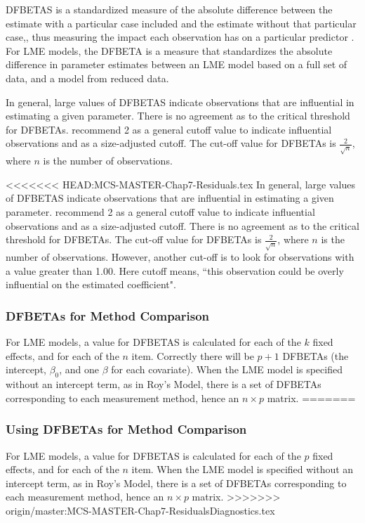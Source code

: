 \documentclass[12pt, a4paper]{report}
\theoremstyle{plain}
\theoremstyle{definition}
\theoremstyle{remark}
\begin{document}
DFBETAS is a standardized measure of the absolute difference between the estimate with a particular
case included and the estimate without that particular case,, thus measuring the impact each observation has on a particular predictor \citep{belsley2005}. For LME models, the DFBETA is a measure that standardizes the absolute difference in parameter estimates between an LME model based on a full set of data, and a model from reduced data.

In general, large values of DFBETAS indicate observations that are influential in estimating a given parameter. There is no agreement as to the critical threshold for DFBETAs. \citet{belsleywelsch} recommend 2 as a general cutoff value to indicate influential observations and as a size-adjusted cutoff.  The cut-off value for DFBETAs is $\frac{2}{\sqrt{n}}$, where $n$ is the number of observations. 



<<<<<<< HEAD:MCS-MASTER-Chap7-Residuals.tex
In general, large values of DFBETAS indicate observations that are influential in estimating a given parameter. \citet{belsley2005} recommend 2 as a general cutoff value to indicate influential observations and as a size-adjusted cutoff. There is no agreement as to the critical threshold for DFBETAs. The cut-off value for DFBETAs is $\frac{2}{\sqrt{n}}$, where $n$ is the number of observations. However, another cut-off is to look for observations with a value greater than 1.00. Here cutoff means,
``this observation could be overly influential on the estimated coefficient".



\subsubsection{DFBETAs for Method Comparison}
	
	For LME models, a value for DFBETAS is calculated for each of the $k$ fixed effects, and for each of the $n$ item. Correctly there will be $p+1$ DFBETAs (the intercept, $\beta_0$, and one $\beta$ for each covariate). When the LME model is specified without an intercept term, as in Roy's Model, there is a set of DFBETAs corresponding to each measurement method, hence an $n \times p$ matrix.
=======
\subsubsection{Using DFBETAs for Method Comparison}
For LME models, a value for DFBETAS is calculated for each of the $p$ fixed effects, and for each of the $n$ item. When the LME model is specified without an intercept term, as in Roy's Model, there is a set of DFBETAs corresponding to each measurement method, hence an $n \times p$ matrix.
>>>>>>> origin/master:MCS-MASTER-Chap7-ResidualsDiagnostics.tex
	
\end{document}
